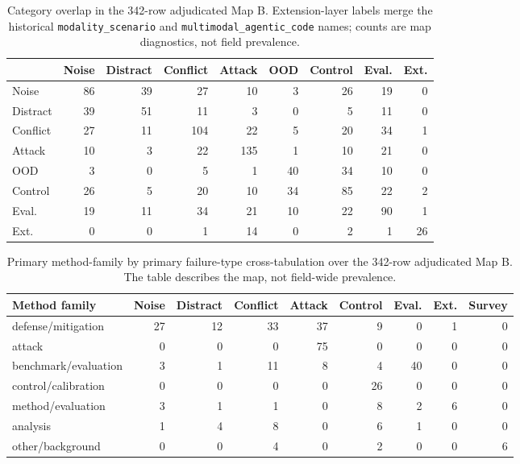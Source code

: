 \documentclass[11pt]{article}
\begin{document}

\begin{table}[t]
\centering
\scriptsize
\begin{tabular}{lrrrrrrrr}
\toprule
 & Noise & Distract & Conflict & Attack & OOD & Control & Eval. & Ext. \\ 
\midrule
Noise & 86 & 39 & 27 & 10 & 3 & 26 & 19 & 0 \\ 
Distract & 39 & 51 & 11 & 3 & 0 & 5 & 11 & 0 \\ 
Conflict & 27 & 11 & 104 & 22 & 5 & 20 & 34 & 1 \\ 
Attack & 10 & 3 & 22 & 135 & 1 & 10 & 21 & 0 \\ 
OOD & 3 & 0 & 5 & 1 & 40 & 34 & 10 & 0 \\ 
Control & 26 & 5 & 20 & 10 & 34 & 85 & 22 & 2 \\ 
Eval. & 19 & 11 & 34 & 21 & 10 & 22 & 90 & 1 \\ 
Ext. & 0 & 0 & 1 & 14 & 0 & 2 & 1 & 26 \\ 
\bottomrule
\end{tabular}
\caption{Category overlap in the 342-row adjudicated Map B. Extension-layer labels merge the historical \texttt{modality\_scenario} and \texttt{multimodal\_agentic\_code} names; counts are map diagnostics, not field prevalence.}
\label{tab:category-overlap}
\end{table}


\begin{table}[t]
\centering
\scriptsize
\begin{tabular}{lrrrrrrrr}
\toprule
\textbf{Method family} & Noise & Distract & Conflict & Attack & Control & Eval. & Ext. & Survey \\ 
\midrule
defense/mitigation & 27 & 12 & 33 & 37 & 9 & 0 & 1 & 0 \\ 
attack & 0 & 0 & 0 & 75 & 0 & 0 & 0 & 0 \\ 
benchmark/evaluation & 3 & 1 & 11 & 8 & 4 & 40 & 0 & 0 \\ 
control/calibration & 0 & 0 & 0 & 0 & 26 & 0 & 0 & 0 \\ 
method/evaluation & 3 & 1 & 1 & 0 & 8 & 2 & 6 & 0 \\ 
analysis & 1 & 4 & 8 & 0 & 6 & 1 & 0 & 0 \\ 
other/background & 0 & 0 & 4 & 0 & 2 & 0 & 0 & 6 \\ 
\bottomrule
\end{tabular}
\caption{Primary method-family by primary failure-type cross-tabulation over the 342-row adjudicated Map B. The table describes the map, not field-wide prevalence.}
\label{tab:method-failure-crosstab}
\end{table}
\end{document}
